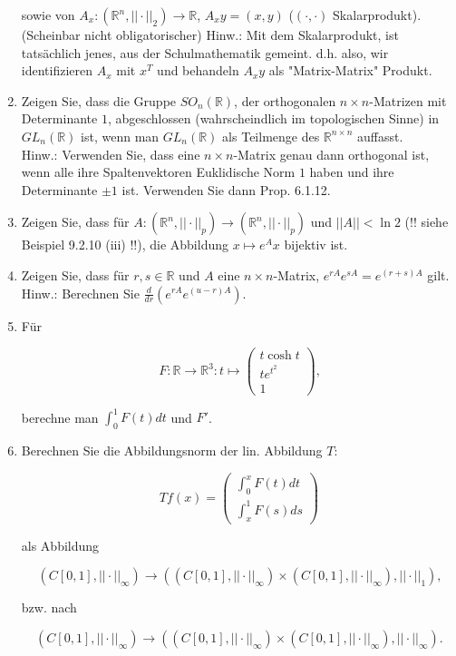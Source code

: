 \documentclass{article}
\begin{document}
\begin{enumerate}
sowie von $A_x: (\mathbb{R}^n, || \cdot ||_2) \rightarrow \mathbb{R}$, $A_x y = (x, y)$ ($( \cdot, \cdot )$ Skalarprodukt). \\
(Scheinbar nicht obligatorischer) Hinw.: Mit dem Skalarprodukt, ist tatsächlich jenes, aus der Schulmathematik gemeint. d.h. also, wir identifizieren $A_x$ mit $x^T$ und behandeln $A_x y$ als "Matrix-Matrix" Produkt.

\item Zeigen Sie, dass die Gruppe $SO_n(\mathbb{R})$, der orthogonalen $n \times n$-Matrizen mit Determinante $1$, abgeschlossen (wahrscheindlich im topologischen Sinne) in $GL_n(\mathbb{R})$ ist, wenn man $GL_n(\mathbb{R})$ als Teilmenge des $\mathbb{R}^{n \times n}$ auffasst. \\
Hinw.: Verwenden Sie, dass eine $n \times n$-Matrix genau dann orthogonal ist, wenn alle ihre Spaltenvektoren Euklidische Norm $1$ haben und ihre Determinante $\pm 1$ ist. Verwenden Sie dann Prop. 6.1.12.

\item Zeigen Sie, dass für $A: (\mathbb{R}^n, || \cdot ||_p) \rightarrow (\mathbb{R}^n, || \cdot ||_p)$ und $||A|| < \ln{2}$ (!! siehe Beispiel 9.2.10 (iii) !!), die Abbildung $x \mapsto e^A x$ bijektiv ist.

\item Zeigen Sie, dass für $r, s \in \mathbb{R}$ und $A$ eine $n \times n$-Matrix, $e^{rA} e^{sA} = e^{(r+s)A}$ gilt. \\
Hinw.: Berechnen Sie $\frac{d}{dr} (e^{rA} e^{(u-r)A})$.

\item Für

\[
    F: \mathbb{R} \rightarrow \mathbb{R}^3: t \mapsto
    \begin{pmatrix}
        t \cosh{t} \\
        t e^{t^2} \\
        1
    \end{pmatrix}
    \text{,}
\]

berechne man $\int_{0}^{1} F(t) dt$ und $F'$.

\item Berechnen Sie die Abbildungsnorm der lin. Abbildung $T$:

\[
    Tf(x) =
    \begin{pmatrix}
        \int_{0}^{x} F(t) dt \\
        \int_{x}^{1} F(s) ds
    \end{pmatrix}
\]

als Abbildung

\[
    ( C[0, 1], || \cdot ||_{\infty} ) \rightarrow (
    ( C[0, 1], || \cdot ||_{\infty} ) \times
    ( C[0, 1], || \cdot ||_{\infty} ), || \cdot ||_1 )
    \text{,}
\]

bzw. nach

\[
    ( C[0, 1], || \cdot ||_{\infty} ) \rightarrow (
    ( C[0, 1], || \cdot ||_{\infty} ) \times
    ( C[0, 1], || \cdot ||_{\infty} ), || \cdot ||_{\infty} )
    \text{.}
\]

\end{enumerate}
\end{document}
